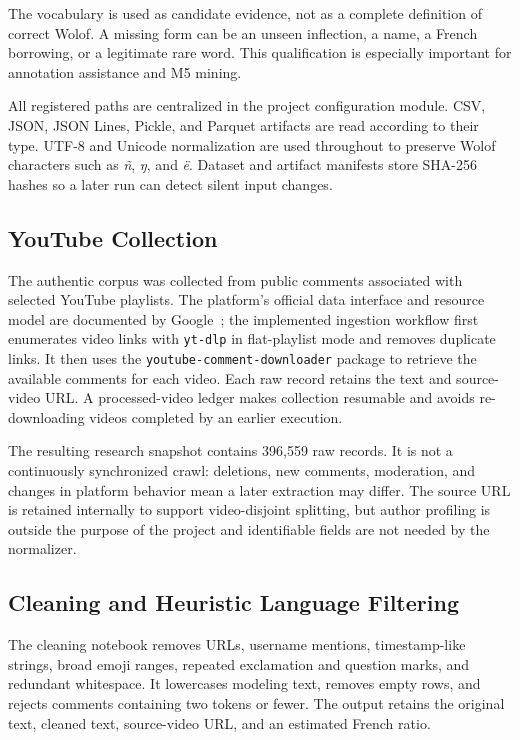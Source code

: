 \documentclass[12pt, a4paper, twoside, openany]{report}
\begin{document}
The vocabulary is used as candidate evidence, not as a complete definition of correct Wolof. A missing form can be an unseen inflection, a name, a French borrowing, or a legitimate rare word. This qualification is especially important for annotation assistance and M5 mining.

All registered paths are centralized in the project configuration module. CSV, JSON, JSON Lines, Pickle, and Parquet artifacts are read according to their type. UTF-8 and Unicode normalization are used throughout to preserve Wolof characters such as \textit{ñ}, \textit{ŋ}, and \textit{ë}. Dataset and artifact manifests store SHA-256 hashes so a later run can detect silent input changes.


\subsection{YouTube Collection}

The authentic corpus was collected from public comments associated with selected YouTube playlists. The platform's official data interface and resource model are documented by Google~\cite{youtube2026api}; the implemented ingestion workflow first enumerates video links with \texttt{yt-dlp} in flat-playlist mode and removes duplicate links. It then uses the \texttt{youtube\allowbreak-comment\allowbreak-downloader} package to retrieve the available comments for each video. Each raw record retains the text and source-video URL. A processed-video ledger makes collection resumable and avoids re-downloading videos completed by an earlier execution.

The resulting research snapshot contains 396,559 raw records. It is not a continuously synchronized crawl: deletions, new comments, moderation, and changes in platform behavior mean a later extraction may differ. The source URL is retained internally to support video-disjoint splitting, but author profiling is outside the purpose of the project and identifiable fields are not needed by the normalizer.


\subsection{Cleaning and Heuristic Language Filtering}

The cleaning notebook removes URLs, username mentions, timestamp-like strings, broad emoji ranges, repeated exclamation and question marks, and redundant whitespace. It lowercases modeling text, removes empty rows, and rejects comments containing two tokens or fewer. The output retains the original text, cleaned text, source-video URL, and an estimated French ratio.
\end{document}
